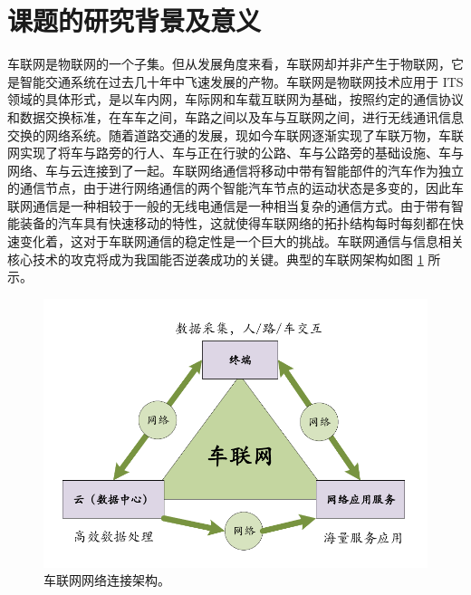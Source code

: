 \section{课题的研究背景及意义}\label{section1-1}
\textcolor[RGB]{202,12,22}{车联网是物联网的一个子集。但从发展角度来看，车联网却并非产生于物联网，它是智能交通系统在过去几十年中飞速发展的产物。车联网是物联网技术应用于 ITS领域的具体形式，是以车内网，车际网和车载互联网为基础，按照约定的通信协议和数据交换标准，在车车之间，车路之间以及车与互联网之间，进行无线通讯信息交换的网络系统。随着道路交通的发展，现如今车联网逐渐实现了车联万物，车联网实现了将车与路旁的行人、车与正在行驶的公路、车与公路旁的基础设施、车与网络、车与云连接到了一起。车联网络通信将移动中带有智能部件的汽车作为独立的通信节点，由于进行网络通信的两个智能汽车节点的运动状态是多变的，因此车联网通信是一种相较于一般的无线电通信是一种相当复杂的通信方式。由于带有智能装备的汽车具有快速移动的特性，这就使得车联网络的拓扑结构每时每刻都在快速变化着，这对于车联网通信的稳定性是一个巨大的挑战。车联网通信与信息相关核心技术的攻克将成为我国能否逆袭成功的关键。典型的车联网架构如图 \ref{车联网网络连接架构} 所示。}
\begin{figure}[H]
\centering
\includegraphics[width=12cm]{figures//chap1//车联网网络连接架构.pdf}
\caption{车联网网络连接架构。}
\label{车联网网络连接架构}
\end{figure}

